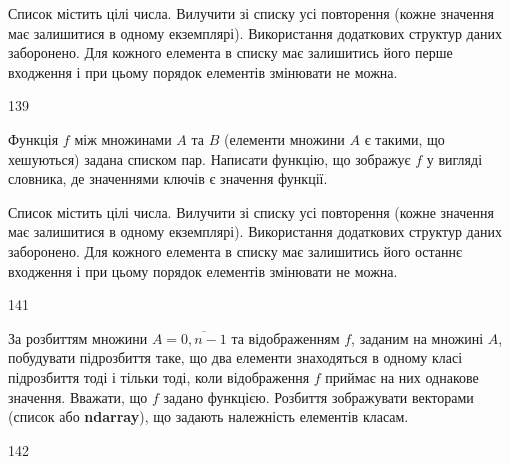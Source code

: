 Список містить цілі числа. Вилучити зі списку усі повторення (кожне значення має залишитися в одному екземплярі). Використання додаткових структур даних заборонено. Для кожного елемента в списку має залишитись його перше входження і при цьому порядок елементів змінювати не можна.
\\\par
139 














Функція $f$ між множинами $A$ та $B$ (елементи множини $A$ є такими, що хешуються) задана списком пар. Написати функцію, що зображує $f$ у вигляді словника, де значеннями ключів є значення функції.
\\\par
{} 














Список містить цілі числа. Вилучити зі списку усі повторення (кожне значення має залишитися в одному екземплярі). Використання додаткових структур даних заборонено. Для кожного елемента в списку має залишитись його останнє входження і при цьому порядок елементів змінювати не можна.
\\\par
141 














За розбиттям множини $A=\overline{0,n-1}$ та відображенням $f$, заданим на множині $A$, побудувати підрозбиття таке, що два елементи знаходяться в одному класі підрозбиття тоді і тільки тоді, коли відображення $f$ приймає на них однакове значення. Вважати, що $f$ задано функцією. Розбиття зображувати векторами (список або  \textbf{ndarray}), що задають належність елементів класам.
\\\par
142 














